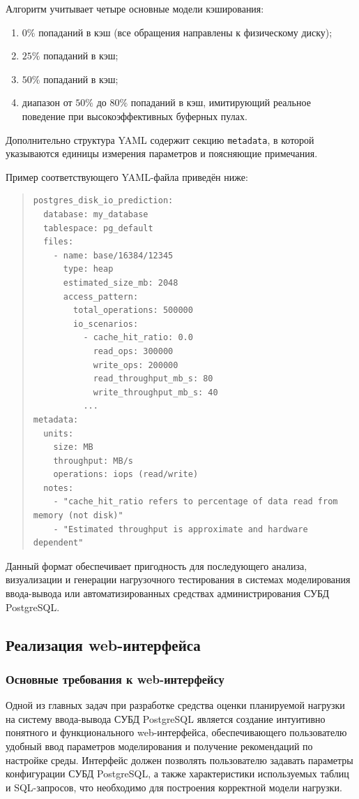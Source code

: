 Алгоритм учитывает четыре основные модели кэширования:
\begin{enumerate}
    \item $0\%$ попаданий в кэш (все обращения направлены к физическому диску);
    \item $25\%$ попаданий в кэш;
    \item $50\%$ попаданий в кэш;
    \item диапазон от $50\%$ до $80\%$ попаданий в кэш, имитирующий реальное поведение при высокоэффективных буферных пулах.
\end{enumerate}

Дополнительно структура YAML содержит секцию \texttt{metadata}, в которой указываются единицы измерения параметров и поясняющие примечания.

Пример соответствующего YAML-файла приведён ниже:
\begin{quote}
\footnotesize
\begin{verbatim}
postgres_disk_io_prediction:
  database: my_database
  tablespace: pg_default
  files:
    - name: base/16384/12345
      type: heap
      estimated_size_mb: 2048
      access_pattern:
        total_operations: 500000
        io_scenarios:
          - cache_hit_ratio: 0.0
            read_ops: 300000
            write_ops: 200000
            read_throughput_mb_s: 80
            write_throughput_mb_s: 40
          ...
metadata:
  units:
    size: MB
    throughput: MB/s
    operations: iops (read/write)
  notes:
    - "cache_hit_ratio refers to percentage of data read from memory (not disk)"
    - "Estimated throughput is approximate and hardware dependent"
\end{verbatim}
\end{quote}

Данный формат обеспечивает пригодность для последующего анализа, визуализации и генерации нагрузочного тестирования в системах моделирования ввода-вывода или автоматизированных средствах администрирования СУБД PostgreSQL.




\subsection{Реализация web-интерфейса}
\subsubsection{Основные требования к web-интерфейсу}

Одной из главных задач при разработке средства оценки пла\-ни\-руемой наг\-руз\-ки на систему ввода-вывода СУБД PostgreSQL является создание интуитивно понятного и функционального web-интерфейса, обеспечивающего пользователю удобный ввод параметров моделирования и получение рекомендаций по настройке среды. Интерфейс должен позволять пользователю задавать параметры конфигурации СУБД PostgreSQL, а также характеристики используемых таблиц и SQL-запросов, что необходимо для построения корректной модели нагрузки.


